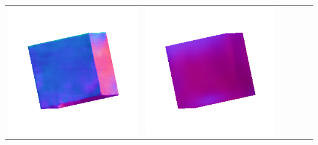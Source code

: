 \begin{tabularx}{\linewidth}{@{}Y@{}Y@{}Y@{}Y@{}Y@{}Y@{}}
\includegraphics[width=\linewidth]{semisynthetic/20150514_0_marrnet_out.png} &
\includegraphics[width=\linewidth]{semisynthetic/20150514_0_ef_out.png} \\

\end{tabularx}
